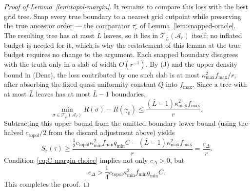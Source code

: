 \documentclass[11pt]{article}
\theoremstyle{plain}
\theoremstyle{definition}
\theoremstyle{remark}
\newcommand{\cA}{\mathcal{A}}
\newcommand{\cT}{\mathcal{T}}
\begin{document}
\begin{proof}[Proof of Lemma~\ref{lem:topol-margin}]
It remains to compare this loss with the best grid tree.  Snap every true
boundary to a nearest grid cutpoint while preserving the true ancestor order
--- the comparator \(\tau_r^\circ\) of Lemma~\ref{lem:snapped-oracle}.
The resulting tree has at most \(\bar L\) leaves, so it lies in
\(\cT_{\bar L}(\cA_r)\) itself; no inflated budget is needed for it, which is
why the restatement of this lemma at the true budget requires no change to
the argument.  Each snapped
boundary disagrees with the truth only in a slab of width \(O(r^{-1})\).
By (J) and the upper density bound in (Dens), the loss contributed by one
such slab is at most
\(\kappa_{\max}^2f_{\max}/r\), after absorbing the fixed quasi-uniformity
constant \(\bar Q\) into \(f_{\max}\).  Since a tree with at most \(\bar L\) leaves has
at most \(\bar L-1\) boundaries,
\[
  \min_{\sigma\in\cT_{\bar L}(\cA_r)}R(\sigma)
  -
  R(\gamma_0)
  \le
  \frac{(\bar L-1)\kappa_{\max}^2f_{\max}}{r}.
\]
Subtracting this upper bound from the omitted-boundary lower bound (using
the halved \(c_{\mathrm{topol}}/2\) from the discard adjustment above) yields
\[
  S_r(\tau)
  \ge
  \frac{
    \frac12 c_{\mathrm{topol}}\kappa_{\min}^2f_{\min}q_{\min}C
    -
    (\bar L-1)\kappa_{\max}^2f_{\max}
  }{r}
  =
  \frac{c_\Delta}{r}.
\]
Condition~\eqref{eq:C-margin-choice} implies not only \(c_\Delta>0\), but
\[
  c_\Delta
  >
  \frac14c_{\mathrm{topol}}\kappa_{\min}^2f_{\min}q_{\min}C.
\]
This completes the proof.
\end{proof}
\end{document}
